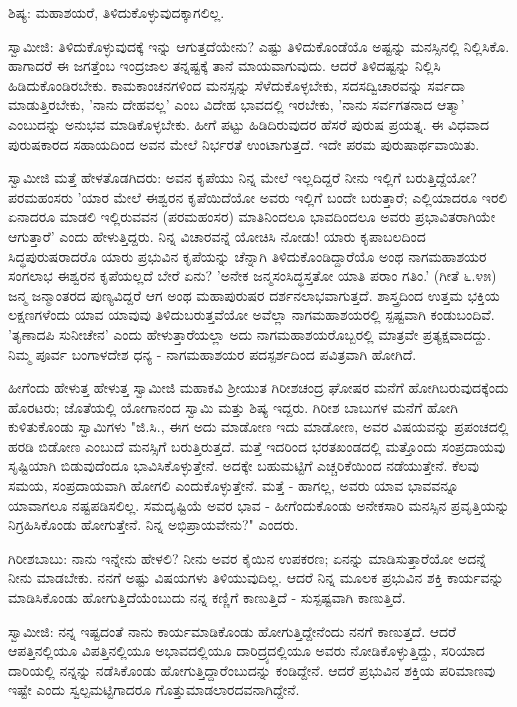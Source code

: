 ಶಿಷ್ಯ: ಮಹಾಶಯರೆ, ತಿಳಿದುಕೊಳ್ಳುವುದಕ್ಕಾಗಲಿಲ್ಲ.

ಸ್ವಾಮೀಜಿ: ತಿಳಿದುಕೊಳ್ಳುವುದಕ್ಕೆ ಇನ್ನು ಆಗುತ್ತದೆಯೇನು? ಎಷ್ಟು ತಿಳಿದುಕೊಂಡೆಯೊ ಅಷ್ಟನ್ನು ಮನಸ್ಸಿನಲ್ಲಿ ನಿಲ್ಲಿಸಿಕೊ. ಹಾಗಾದರೆ ಈ ಜಗತ್ತೆಂಬ ಇಂದ್ರಜಾಲ ತನ್ನಷ್ಟಕ್ಕೆ ತಾನೆ ಮಾಯವಾಗುವುದು. ಆದರೆ ತಿಳಿದಷ್ಟನ್ನು ನಿಲ್ಲಿಸಿ ಹಿಡಿದುಕೊಂಡಿರಬೇಕು. ಕಾಮಕಾಂಚನಗಳಿಂದ ಮನಸ್ಸನ್ನು ಸೆಳೆದುಕೊಳ್ಳಬೇಕು, ಸದಸದ್ವಿಚಾರವನ್ನು ಸರ್ವದಾ ಮಾಡುತ್ತಿರಬೇಕು, 'ನಾನು ದೇಹವಲ್ಲ' ಎಂಬ ವಿದೇಹ ಭಾವದಲ್ಲಿ ಇರಬೇಕು, 'ನಾನು ಸರ್ವಗತನಾದ ಆತ್ಮಾ' ಎಂಬುದನ್ನು ಅನುಭವ ಮಾಡಿಕೊಳ್ಳಬೇಕು. ಹೀಗೆ ಪಟ್ಟು ಹಿಡಿದಿರುವುದರ ಹೆಸರೆ ಪುರುಷ ಪ್ರಯತ್ನ. ಈ ವಿಧವಾದ ಪುರುಷಕಾರದ ಸಹಾಯದಿಂದ ಅವನ ಮೇಲೆ ನಿರ್ಭರತೆ ಉಂಟಾಗುತ್ತದೆ. ಇದೇ ಪರಮ ಪುರುಷಾರ್ಥವಾಯಿತು.

ಸ್ವಾಮೀಜಿ ಮತ್ತೆ ಹೇಳತೊಡಗಿದರು: ಅವನ ಕೃಪೆಯು ನಿನ್ನ ಮೇಲೆ ಇಲ್ಲದಿದ್ದರೆ ನೀನು ಇಲ್ಲಿಗೆ ಬರುತ್ತಿದ್ದೆಯೋ? ಪರಮಹಂಸರು 'ಯಾರ ಮೇಲೆ ಈಶ್ವರನ ಕೃಪೆಯಿದೆಯೋ ಅವರು ಇಲ್ಲಿಗೆ ಬಂದೇ ಬರುತ್ತಾರೆ; ಎಲ್ಲಿಯಾದರೂ ಇರಲಿ ಏನಾದರೂ ಮಾಡಲಿ ಇಲ್ಲಿರುವವನ (ಪರಮಹಂಸರ) ಮಾತಿನಿಂದಲೂ ಭಾವದಿಂದಲೂ ಅವರು ಪ್ರಭಾವಿತರಾಗಿಯೇ ಆಗುತ್ತಾರೆ' ಎಂದು ಹೇಳುತ್ತಿದ್ದರು. ನಿನ್ನ ವಿಚಾರವನ್ನೆ ಯೋಚಿಸಿ ನೋಡು! ಯಾರು ಕೃಪಾಬಲದಿಂದ ಸಿದ್ಧಪುರುಷರಾದರೊ ಯಾರು ಪ್ರಭುವಿನ ಕೃಪೆಯನ್ನು ಚೆನ್ನಾಗಿ ತಿಳಿದುಕೊಂಡಿದ್ದಾರೆಯೊ ಅಂಥ ನಾಗಮಹಾಶಯರ ಸಂಗಲಾಭ ಈಶ್ವರನ ಕೃಪೆಯಲ್ಲದೆ ಬೇರೆ ಏನು? 'ಅನೇಕ ಜನ್ಮಸಂಸಿದ್ಧಸ್ತತೋ ಯಾತಿ ಪರಾಂ ಗತಿಂ.' (ಗೀತೆ ೬.೪೫) ಜನ್ಮ ಜನ್ಮಾಂತರದ ಪುಣ್ಯವಿದ್ದರೆ ಆಗ ಅಂಥ ಮಹಾಪುರುಷರ ದರ್ಶನಲಾಭವಾಗುತ್ತದೆ. ಶಾಸ್ತ್ರದಿಂದ ಉತ್ತಮ ಭಕ್ತಿಯ ಲಕ್ಷಣಗಳೆಂದು ಯಾವ ಯಾವುವು ತಿಳಿದುಬರುತ್ತವೆಯೋ ಅವೆಲ್ಲಾ ನಾಗಮಹಾಶಯರಲ್ಲಿ ಸ್ಪಷ್ಟವಾಗಿ ಕಂಡುಬಂದಿವೆ. 'ತೃಣಾದಪಿ ಸುನೀಚೇನ' ಎಂದು ಹೇಳುತ್ತಾರೆಯಲ್ಲಾ ಅದು ನಾಗಮಹಾಶಯರೊಬ್ಬರಲ್ಲಿ ಮಾತ್ರವೇ ಪ್ರತ್ಯಕ್ಷವಾದದ್ದು. ನಿಮ್ಮ ಪೂರ್ವ ಬಂಗಾಳದೇಶ ಧನ್ಯ - ನಾಗಮಹಾಶಯರ ಪದಸ್ಪರ್ಶದಿಂದ ಪವಿತ್ರವಾಗಿ ಹೋಗಿದೆ.

ಹೀಗೆಂದು ಹೇಳುತ್ತ ಹೇಳುತ್ತ ಸ್ವಾಮೀಜಿ ಮಹಾಕವಿ ಶ‍್ರೀಯುತ ಗಿರೀಶಚಂದ್ರ ಘೋಷರ ಮನೆಗೆ ಹೋಗಿಬರುವುದಕ್ಕೆಂದು ಹೊರಟರು; ಜೊತೆಯಲ್ಲಿ ಯೋಗಾನಂದ ಸ್ವಾಮಿ ಮತ್ತು ಶಿಷ್ಯ ಇದ್ದರು. ಗಿರೀಶ ಬಾಬುಗಳ ಮನೆಗೆ ಹೋಗಿ ಕುಳಿತುಕೊಂಡು ಸ್ವಾಮಿಗಳು "ಜಿ.ಸಿ., ಈಗ ಅದು ಮಾಡೋಣ ಇದು ಮಾಡೋಣ, ಅವರ ವಿಷಯವನ್ನು ಪ್ರಪಂಚದಲ್ಲಿ ಹರಡಿ ಬಿಡೋಣ ಎಂಬುದೆ ಮನಸ್ಸಿಗೆ ಬರುತ್ತಿರುತ್ತದೆ. ಮತ್ತೆ ಇದರಿಂದ ಭರತಖಂಡದಲ್ಲಿ ಮತ್ತೊಂದು ಸಂಪ್ರದಾಯವು ಸೃಷ್ಟಿಯಾಗಿ ಬಿಡುವುದೆಂದೂ ಭಾವಿಸಿಕೊಳ್ಳುತ್ತೇನೆ. ಅದಕ್ಕೇ ಬಹುಮಟ್ಟಿಗೆ ಎಚ್ಚರಿಕೆಯಿಂದ ನಡೆಯುತ್ತೇನೆ. ಕೆಲವು ಸಮಯ, ಸಂಪ್ರದಾಯವಾಗಿ ಹೋಗಲಿ ಎಂದುಕೊಳ್ಳುತ್ತೇನೆ. ಮತ್ತೆ - ಹಾಗಲ್ಲ, ಅವರು ಯಾವ ಭಾವವನ್ನೂ ಯಾವಾಗಲೂ ನಷ್ಟಪಡಿಸಲಿಲ್ಲ. ಸಮದೃಷ್ಟಿಯೆ ಅವರ ಭಾವ - ಹೀಗೆಂದುಕೊಂಡು ಅನೇಕಸಾರಿ ಮನಸ್ಸಿನ ಪ್ರವೃತ್ತಿಯನ್ನು ನಿಗ್ರಹಿಸಿಕೊಂಡು ಹೋಗುತ್ತೇನೆ. ನಿನ್ನ ಅಭಿಪ್ರಾಯವೇನು?" ಎಂದರು.

ಗಿರೀಶಬಾಬು: ನಾನು ಇನ್ನೇನು ಹೇಳಲಿ? ನೀನು ಅವರ ಕೈಯಿನ ಉಪಕರಣ; ಏನನ್ನು ಮಾಡಿಸುತ್ತಾರೆಯೋ ಅದನ್ನೆ ನೀನು ಮಾಡಬೇಕು. ನನಗೆ ಅಷ್ಟು ವಿಷಯಗಳು ತಿಳಿಯುವುದಿಲ್ಲ. ಆದರೆ ನಿನ್ನ ಮೂಲಕ ಪ್ರಭುವಿನ ಶಕ್ತಿ ಕಾರ್ಯವನ್ನು ಮಾಡಿಸಿಕೊಂಡು ಹೋಗುತ್ತಿದೆಯೆಂಬುದು ನನ್ನ ಕಣ್ಣಿಗೆ ಕಾಣುತ್ತಿದೆ - ಸುಸ್ಪಷ್ಟವಾಗಿ ಕಾಣುತ್ತಿದೆ.

ಸ್ವಾಮೀಜಿ: ನನ್ನ ಇಷ್ಟದಂತೆ ನಾನು ಕಾರ್ಯಮಾಡಿಕೊಂಡು ಹೋಗುತ್ತಿದ್ದೇನೆಂದು ನನಗೆ ಕಾಣುತ್ತದೆ. ಆದರೆ ಆಪತ್ತಿನಲ್ಲಿಯೂ ವಿಪತ್ತಿನಲ್ಲಿಯೂ ಅಭಾವದಲ್ಲಿಯೂ ದಾರಿದ್ರ್ಯದಲ್ಲಿಯೂ ಅವರು ನೋಡಿಕೊಳ್ಳುತ್ತಿದ್ದು, ಸರಿಯಾದ ದಾರಿಯಲ್ಲಿ ನನ್ನನ್ನು ನಡೆಸಿಕೊಂಡು ಹೋಗುತ್ತಿದ್ದಾರೆಂಬುದನ್ನು ಕಂಡಿದ್ದೇನೆ. ಆದರೆ ಪ್ರಭುವಿನ ಶಕ್ತಿಯ ಪರಿಮಾಣವು ಇಷ್ಟೇ ಎಂದು ಸ್ವಲ್ಪಮಟ್ಟಿಗಾದರೂ ಗೊತ್ತುಮಾಡಲಾರದವನಾಗಿದ್ದೇನೆ.

